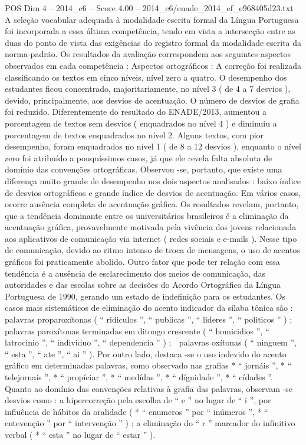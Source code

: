 \begin{textsample}{POS Dim 4 – 2014\_c6 – Score 4.00 – 2014\_c6/enade\_2014\_ef\_e968405d23.txt}
A seleção vocabular adequada à modalidade escrita formal da Língua Portuguesa foi incorporada a essa última competência, tendo em vista a intersecção entre as duas do ponto de vista das exigências do registro formal da modalidade escrita da norma-padrão.
Os resultados da avaliação correspondem aos seguintes aspectos observados em cada competência : Aspectos ortográficos : A correção foi realizada classificando os textos em cinco níveis, nível zero a quatro.
O desempenho dos estudantes ficou concentrado, majoritariamente, no nível 3 ( de 4 a 7 desvios ), devido, principalmente, aos desvios de acentuação.
O número de desvios de grafia foi reduzido.
Diferentemente do resultado do ENADE/2013, aumentou a porcentagem de textos sem desvios ( enquadrados no nível 4 ) e diminuiu a porcentagem de textos enquadrados no nível 2.
Alguns textos, com pior desempenho, foram enquadrados no nível 1 ( de 8 a 12 desvios ), enquanto o nível zero foi atribuído a pouquíssimos casos, já que ele revela falta absoluta de domínio das convenções ortográficas.
Observou -se, portanto, que existe uma diferença muito grande de desempenho nos dois aspectos analisados : baixo índice de desvios ortográficos e grande índice de desvios de acentuação.
Em vários casos, ocorre ausência completa de acentuação gráfica.
Os resultados revelam, portanto, que a tendência dominante entre os universitários brasileiros é a eliminação da acentuação gráfica, provavelmente motivada pela vivência dos jovens relacionada aos aplicativos de comunicação via internet ( redes sociais e e-mails ).
Nesse tipo de comunicação, devido ao ritmo intenso de troca de mensagens, o uso de acentos gráficos foi praticamente abolido.
Outro fator que pode ter relação com essa tendência é a ausência de esclarecimento dos meios de comunicação, das autoridades e das escolas sobre as decisões do Acordo Ortográfico da Língua Portuguesa de 1990, gerando um estado de indefinição para os estudantes.
Os casos mais sistemáticos de eliminação do acento indicador da sílaba tônica são :  palavras proparoxítonas ( “ ridiculos ”, “ publicas ”, “ lideres ”, “ politicos ” ) ;  palavras paroxítonas terminadas em ditongo crescente ( “ homicidios ”, “ latrocinio ”, “ individuo ”, “ dependencia ” ) ;  palavras oxítonas ( “ ninguem ”, “ esta ”, “ ate ”, “ ai ” ).
Por outro lado, destaca -se o uso indevido do acento gráfico em determinadas palavras, como observado nas grafias * “ jornáis ”, * “ telejornaís ”, * “ propíciar ”, * “ medídas ”, * “ dígnidade ”, * “ cídades ”.
Quanto ao domínio das convenções relativas à grafia das palavras, observam -se desvios como : a hipercorreção pela escolha de “ e ” no lugar de “ i ”, por influência de hábitos da oralidade ( * “ enumeros ” por “ inúmeros ”, * “ entevenção ” por “ intervenção ” ) ; a eliminação do “ r ” marcador do infinitivo verbal ( * “ esta ” no lugar de “ estar ” ).

\end{textsample}
